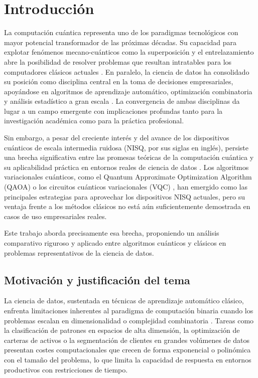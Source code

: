 \chapter{Introducción}

La computación cuántica representa uno de los paradigmas tecnológicos con mayor potencial transformador de las próximas décadas. Su capacidad para explotar fenómenos mecano-cuánticos como la superposición y el entrelazamiento abre la posibilidad de resolver problemas que resultan intratables para los computadores clásicos actuales \citep{preskill2018}. En paralelo, la ciencia de datos ha consolidado su posición como disciplina central en la toma de decisiones empresariales, apoyándose en algoritmos de aprendizaje automático, optimización combinatoria y análisis estadístico a gran escala \citep{jordan2015}. La convergencia de ambas disciplinas da lugar a un campo emergente con implicaciones profundas tanto para la investigación académica como para la práctica profesional.

Sin embargo, a pesar del creciente interés y del avance de los dispositivos cuánticos de escala intermedia ruidosa (NISQ, por sus siglas en inglés), persiste una brecha significativa entre las promesas teóricas de la computación cuántica y su aplicabilidad práctica en entornos reales de ciencia de datos \citep{preskill2018}. Los algoritmos variacionales cuánticos, como el Quantum Approximate Optimization Algorithm (QAOA) \citep{farhi2014} o los circuitos cuánticos variacionales (VQC) \citep{cerezo2021}, han emergido como las principales estrategias para aprovechar los dispositivos NISQ actuales, pero su ventaja frente a los métodos clásicos no está aún suficientemente demostrada en casos de uso empresariales reales.

Este trabajo aborda precisamente esa brecha, proponiendo un análisis comparativo riguroso y aplicado entre algoritmos cuánticos y clásicos en problemas representativos de la ciencia de datos.

\section{Motivación y justificación del tema}

La ciencia de datos, sustentada en técnicas de aprendizaje automático clásico, enfrenta limitaciones inherentes al paradigma de computación binaria cuando los problemas escalan en dimensionalidad o complejidad combinatoria \citep{biamonte2017}. Tareas como la clasificación de patrones en espacios de alta dimensión, la optimización de carteras de activos o la segmentación de clientes en grandes volúmenes de datos presentan costes computacionales que crecen de forma exponencial o polinómica con el tamaño del problema, lo que limita la capacidad de respuesta en entornos productivos con restricciones de tiempo.

